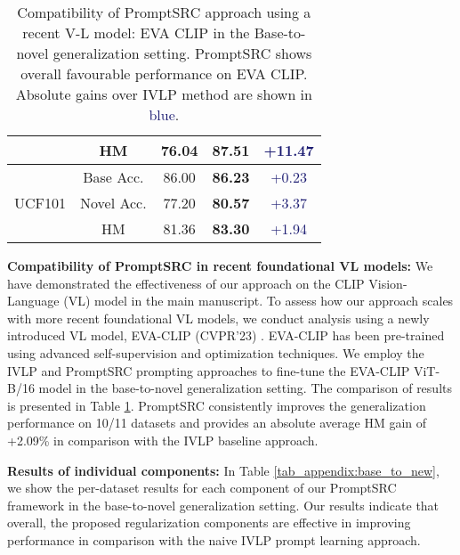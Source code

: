 \documentclass[10pt,twocolumn,letterpaper]{article}
\begin{document}
\begin{center}
\begin{table}[t!]
{\begin{tabular}{lc|c c c}
                               & HM             & 76.04& \textbf{87.51}   &  \textcolor{MidnightBlue}{{+11.47}}\\
\midrule
\multirow{3}{*}{UCF101}        & Base Acc.      & 86.00  &\textbf{86.23}           & \textcolor{MidnightBlue}{{+0.23}}\\
                               & Novel Acc.     & 77.20  &\textbf{80.57 }          &  \textcolor{MidnightBlue}{{+3.37}}\\
                               & HM           & 81.36 &\textbf{83.30}    & \textcolor{MidnightBlue}{{+1.94}}\\
\bottomrule
\end{tabular}
}\vspace{-0.5em}
    \caption{\small\textnormal{Compatibility of PromptSRC approach using a recent V-L model: EVA CLIP \cite{fang2023eva} in the Base-to-novel generalization setting}. PromptSRC shows overall favourable performance on EVA CLIP. Absolute gains over IVLP method are shown in \textcolor{MidnightBlue}{blue}.}
    \label{tab_appendix:eva_clip_comparison}
\end{table}

 \noindent \textbf{{Compatibility of PromptSRC in recent foundational VL models:}} We have demonstrated the effectiveness of our approach on the CLIP  Vision-Language (VL) model in the main manuscript. To assess how our approach scales with more recent foundational VL models, we conduct analysis using a newly introduced VL model, EVA-CLIP (CVPR'23) \cite{fang2023eva}. EVA-CLIP has been pre-trained using advanced self-supervision and optimization techniques. We employ the IVLP and PromptSRC prompting approaches to fine-tune the EVA-CLIP ViT-B/16 model in the base-to-novel generalization setting. The comparison of results is presented in Table \ref{tab_appendix:eva_clip_comparison}. PromptSRC consistently improves the generalization performance on 10/11 datasets and provides an absolute average HM gain of +2.09\% in comparison with the IVLP baseline approach.

\noindent \textbf{{Results of individual components:}} In Table \ref{tab_appendix:base_to_new}, we show the per-dataset results for each component of our PromptSRC framework in the base-to-novel generalization setting. Our results indicate that overall, the proposed regularization components are effective in improving performance in comparison with the naive IVLP prompt learning approach.


\end{center}
\end{document}
